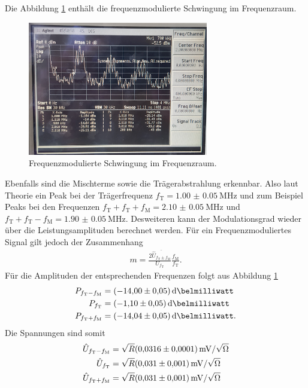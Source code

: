 Die Abbildung \ref{fig:frequenz_freq} enthält die frequenzmodulierte Schwingung
im Frequenzraum.
\begin{figure}
  \centering
  \includegraphics[width=0.7\textwidth]{spec/frequenzmodulation_bereich_fresh_cool.jpg}
  \caption{Frequenzmodulierte
Schwingung im Frequenzraum.}
\label{fig:frequenz_freq}
\end{figure}
Ebenfalls sind die Mischterme sowie die Trägerabstrahlung erkennbar.
Also laut Theorie ein Peak bei der Trägerfrequenz $f_{\text{T}}=\SI{1.00(5)}{\mega\hertz}$
und zum Beispiel Peaks bei den Frequenzen
$f_{\text{T}}+f_{\text{T}}+f_{\text{M}} = \SI{2.10(5)}{\mega\hertz}$
und $f_{\text{T}}+f_{\text{T}}-f_{\text{M}} = \SI{1.90(5)}{\mega\hertz}$.
Desweiteren kann der Modulationsgrad wieder
über die Leistungsamplituden berechnet werden.
Für ein Frequenzmoduliertes Signal gilt jedoch der Zusammenhang
\begin{align}
m=\frac{2\overline{\hat{U}_{f_{\text{T}}\pm f_{\text{M}}}}}{U_{f_{\text{T}}}} \frac{f_{\text{M}}}{f_{\text{T}}}. \label{eqn:m_leistung_f}
\end{align}
Für die Amplituden der entsprechenden Frequenzen
folgt aus Abbildung \ref{fig:frequenz_freq}
\begin{align}
P_{f_{\text{T}}-f_{\text{M}}}&=\SI{-14.00(5)}{\deci\belmilliwatt}\notag\\
P_{f_{\text{T}}}&=\SI{-1.10(5)}{\deci\belmilliwatt}\\
P_{f_{\text{T}}+f_{\text{M}}}&=\SI{-14.04(5)}{\deci\belmilliwatt}.\notag
\end{align}
Die Spannungen sind somit
\begin{align}
   \hat{U}_{f_{\text{T}}-f_{\text{M}}}&=\sqrt{R}\SI{0.0316(1)}{\milli\volt\per\sqrt{\ohm}}\\
  \hat{U}_{f_{\text{T}}}&=\sqrt{R}\SI{0.031(1)}{\milli\volt\per\sqrt{\ohm}}\\
  \hat{U}_{f_{\text{T}}+f_{\text{M}}}&=\sqrt{R}\SI{0.031(1)}{\milli\volt\per\sqrt{\ohm}}
\end{align}
